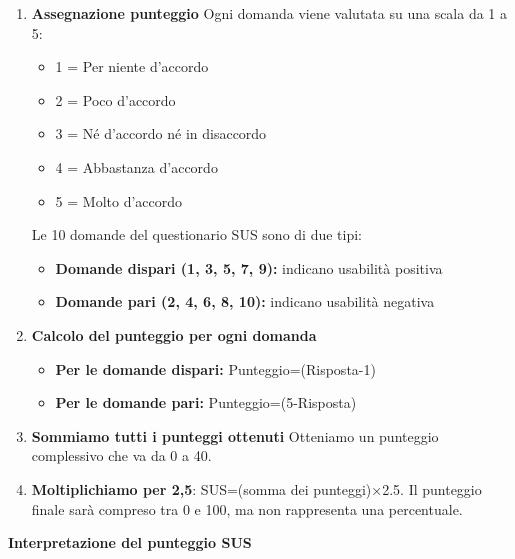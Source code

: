 \begin{enumerate}

    \item \textbf{Assegnazione punteggio}
    \newline 
    Ogni domanda viene valutata su una scala da 1 a 5:

    \begin{itemize}
        \item 1 = Per niente d’accordo
        \item 2 = Poco d’accordo
        \item 3 = Né d’accordo né in disaccordo
        \item 4 = Abbastanza d’accordo
        \item 5 = Molto d’accordo
    \end{itemize}
    Le 10 domande del questionario SUS sono di due tipi:
    \begin{itemize}
        \item \textbf{Domande dispari (1, 3, 5, 7, 9):} indicano usabilità positiva
        
        \item \textbf{Domande pari (2, 4, 6, 8, 10):} indicano usabilità negativa
    \end{itemize}

    \item \textbf{Calcolo del punteggio per ogni domanda}
    
    \begin{itemize}
        \item \textbf{Per le domande dispari:} Punteggio=(Risposta-1)
        
        \item \textbf{Per le domande pari:} Punteggio=(5-Risposta)
    \end{itemize}

    \item \textbf{Sommiamo tutti i punteggi ottenuti}
    \newline
    Otteniamo un punteggio complessivo che va da 0 a 40.

    \item \textbf{Moltiplichiamo per 2,5}: SUS=(somma dei punteggi)×2.5.
    \newline
    Il punteggio finale sarà compreso tra 0 e 100, ma non rappresenta una percentuale.
    
\end{enumerate}

\textbf{Interpretazione del punteggio SUS}

